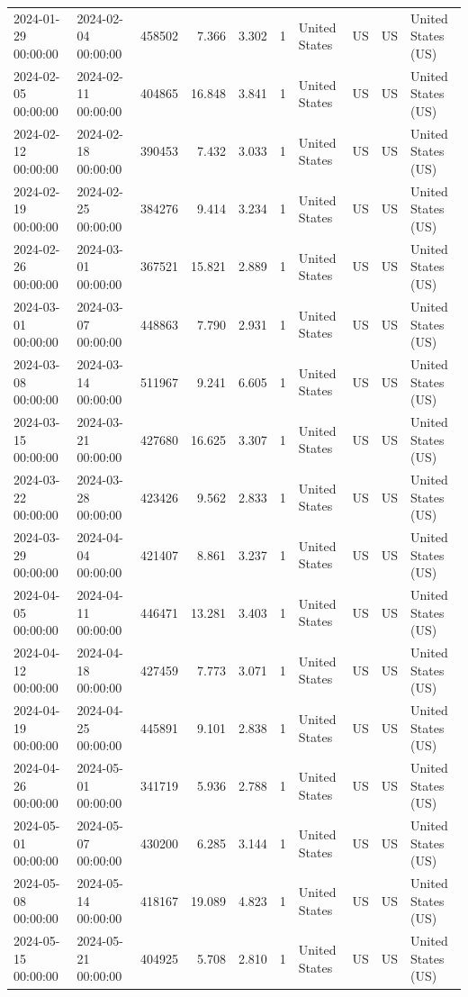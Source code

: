 \begin{tabular}{llrrrlllll}
2024-01-29 00:00:00 & 2024-02-04 00:00:00 & 458502 & 7.366 & 3.302 & 1 & United States & US & US & United States (US) \\
2024-02-05 00:00:00 & 2024-02-11 00:00:00 & 404865 & 16.848 & 3.841 & 1 & United States & US & US & United States (US) \\
2024-02-12 00:00:00 & 2024-02-18 00:00:00 & 390453 & 7.432 & 3.033 & 1 & United States & US & US & United States (US) \\
2024-02-19 00:00:00 & 2024-02-25 00:00:00 & 384276 & 9.414 & 3.234 & 1 & United States & US & US & United States (US) \\
2024-02-26 00:00:00 & 2024-03-01 00:00:00 & 367521 & 15.821 & 2.889 & 1 & United States & US & US & United States (US) \\
2024-03-01 00:00:00 & 2024-03-07 00:00:00 & 448863 & 7.790 & 2.931 & 1 & United States & US & US & United States (US) \\
2024-03-08 00:00:00 & 2024-03-14 00:00:00 & 511967 & 9.241 & 6.605 & 1 & United States & US & US & United States (US) \\
2024-03-15 00:00:00 & 2024-03-21 00:00:00 & 427680 & 16.625 & 3.307 & 1 & United States & US & US & United States (US) \\
2024-03-22 00:00:00 & 2024-03-28 00:00:00 & 423426 & 9.562 & 2.833 & 1 & United States & US & US & United States (US) \\
2024-03-29 00:00:00 & 2024-04-04 00:00:00 & 421407 & 8.861 & 3.237 & 1 & United States & US & US & United States (US) \\
2024-04-05 00:00:00 & 2024-04-11 00:00:00 & 446471 & 13.281 & 3.403 & 1 & United States & US & US & United States (US) \\
2024-04-12 00:00:00 & 2024-04-18 00:00:00 & 427459 & 7.773 & 3.071 & 1 & United States & US & US & United States (US) \\
2024-04-19 00:00:00 & 2024-04-25 00:00:00 & 445891 & 9.101 & 2.838 & 1 & United States & US & US & United States (US) \\
2024-04-26 00:00:00 & 2024-05-01 00:00:00 & 341719 & 5.936 & 2.788 & 1 & United States & US & US & United States (US) \\
2024-05-01 00:00:00 & 2024-05-07 00:00:00 & 430200 & 6.285 & 3.144 & 1 & United States & US & US & United States (US) \\
2024-05-08 00:00:00 & 2024-05-14 00:00:00 & 418167 & 19.089 & 4.823 & 1 & United States & US & US & United States (US) \\
2024-05-15 00:00:00 & 2024-05-21 00:00:00 & 404925 & 5.708 & 2.810 & 1 & United States & US & US & United States (US) \\

\end{tabular}
